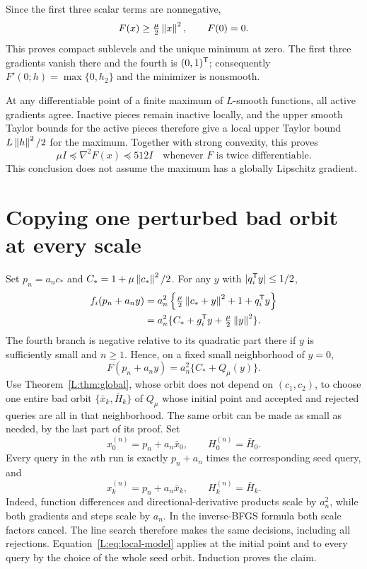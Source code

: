 Since the first three scalar terms are nonnegative,
\[
 F(x)\ge\tfrac\mu2\left\lVert x\right\rVert^2,\qquad F(0)=0.
\]
This proves compact sublevels and the unique minimum at zero. The first three gradients vanish there and the fourth is $(0,1)^{\mathsf T}$; consequently $F'(0;h)=\max\{0,h_2\}$ and the minimizer is nonsmooth.

At any differentiable point of a finite maximum of $L$-smooth functions, all active gradients agree. Inactive pieces remain inactive locally, and the upper smooth Taylor bounds for the active pieces therefore give a local upper Taylor bound $L\left\lVert h\right\rVert^2/2$ for the maximum. Together with strong convexity, this proves
\begin{equation}\label{L:eq:Hbounds}
 \mu I\preceq\nabla^2F(x)\preceq512I
 \quad\text{whenever }F\text{ is twice differentiable}.
\end{equation}
This conclusion does not assume the maximum has a globally Lipschitz gradient.


\setcounter{section}{5}
\setcounter{theorem}{2}
\setcounter{lemma}{2}
\setcounter{corollary}{0}
\setcounter{proposition}{0}
\setcounter{remark}{0}
\setcounter{equation}{12}


\section{Copying one perturbed bad orbit at every scale}

Set $p_n=a_nc_*$ and $C_*=1+\mu\left\lVert c_*\right\rVert^2/2$. For any $y$ with $|q_i^{\mathsf T} y|\le1/2$,
\begin{align*}
 f_i(p_n+a_ny)
 &=a_n^2\left\{\tfrac\mu2\left\lVert c_*+y\right\rVert^2+1+q_i^{\mathsf T} y\right\}\\
 &=a_n^2\{C_*+g_i^{\mathsf T} y+\tfrac\mu2\left\lVert y\right\rVert^2\}.
\end{align*}
The fourth branch is negative relative to its quadratic part there if $y$ is sufficiently small and $n\ge1$. Hence, on a fixed small neighborhood of $y=0$,
\begin{equation}\label{L:eq:local-model}
 F(p_n+a_ny)=a_n^2\{C_*+Q_\mu(y)\}.
\end{equation}
Use Theorem~\ref{L:thm:global}, whose orbit does not depend on $(c_1,c_2)$, to choose one entire bad orbit $\{\bar x_k,\bar H_k\}$ of $Q_\mu$ whose initial point and accepted and rejected queries are all in that neighborhood. The same orbit can be made as small as needed, by the last part of its proof. Set
\[
 x_0^{(n)}=p_n+a_n\bar x_0,\qquad H_0^{(n)}=\bar H_0.
\]
Every query in the $n$th run is exactly $p_n+a_n$ times the corresponding seed query, and
\[
 x_k^{(n)}=p_n+a_n\bar x_k,\qquad H_k^{(n)}=\bar H_k.
\]
Indeed, function differences and directional-derivative products scale by $a_n^2$, while both gradients and steps scale by $a_n$. In the inverse-BFGS formula both scale factors cancel. The line search therefore makes the same decisions, including all rejections. Equation~\eqref{L:eq:local-model} applies at the initial point and to every query by the choice of the whole seed orbit. Induction proves the claim.

